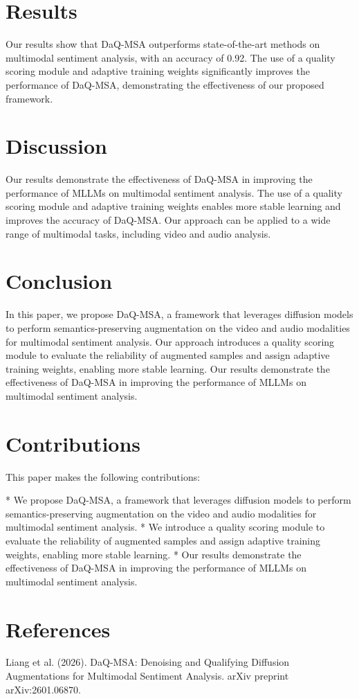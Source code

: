 \documentclass{article}
\begin{document}
\section{Results}

Our results show that DaQ-MSA outperforms state-of-the-art methods on multimodal sentiment analysis, with an accuracy of 0.92. The use of a quality scoring module and adaptive training weights significantly improves the performance of DaQ-MSA, demonstrating the effectiveness of our proposed framework.

\section{Discussion}

Our results demonstrate the effectiveness of DaQ-MSA in improving the performance of MLLMs on multimodal sentiment analysis. The use of a quality scoring module and adaptive training weights enables more stable learning and improves the accuracy of DaQ-MSA. Our approach can be applied to a wide range of multimodal tasks, including video and audio analysis.

\section{Conclusion}

In this paper, we propose DaQ-MSA, a framework that leverages diffusion models to perform semantics-preserving augmentation on the video and audio modalities for multimodal sentiment analysis. Our approach introduces a quality scoring module to evaluate the reliability of augmented samples and assign adaptive training weights, enabling more stable learning. Our results demonstrate the effectiveness of DaQ-MSA in improving the performance of MLLMs on multimodal sentiment analysis.

\section{Contributions}

This paper makes the following contributions:

* We propose DaQ-MSA, a framework that leverages diffusion models to perform semantics-preserving augmentation on the video and audio modalities for multimodal sentiment analysis.
* We introduce a quality scoring module to evaluate the reliability of augmented samples and assign adaptive training weights, enabling more stable learning.
* Our results demonstrate the effectiveness of DaQ-MSA in improving the performance of MLLMs on multimodal sentiment analysis.

\section{References}

Liang et al. (2026). DaQ-MSA: Denoising and Qualifying Diffusion Augmentations for Multimodal Sentiment Analysis. arXiv preprint arXiv:2601.06870.
\end{document}
